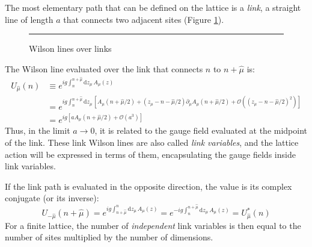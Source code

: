 The most elementary path that can be defined on the lattice is a \emph{link},
\ie a straight line of length $a$ that connects two adjacent sites (Figure \ref{fig:links}).
\begin{figure}[!htb]
    \centering
    \rule{3in}{1.5in}
    \caption{Wilson lines over links}
    \label{fig:links}
\end{figure}
The Wilson line evaluated over the link that connects $n$ to $n+\hat\mu$ is:
\begin{equation}\label{eq:link}
    \begin{aligned}
        U_{\hat\mu}(n) &\equiv e^{ig\int_n^{n+\hat\mu}\mathrm dz_\mu\,A_\mu(z)} \\
                       &= e^{ig\int_n^{n+\hat\mu}\mathrm dz_\mu\,\left[A_\mu(n+\hat\mu/2) + (z_\mu-n-\hat\mu/2)\partial_\mu A_\mu(n+\hat\mu/2)%
                                                                                     + \mathcal O\left((z_\mu-n-\hat\mu/2)^2\right)\right]} \\
                       &= e^{ig\left[aA_\mu(n+\hat\mu/2) + \mathcal O\left(a^3\right)\right]}
    \end{aligned}
\end{equation}
Thus, in the limit $a \to 0$, it is related to the gauge field evaluated at the midpoint of the link.
These link Wilson lines are also called \emph{link variables}, and the lattice action will be expressed in terms of them,
encapsulating the gauge fields inside link variables.

If the link path is evaluated in the opposite direction, the value is its complex conjugate (or its inverse):
\[
    U_{-\hat\mu}(n+\hat\mu) = e^{ig\int^n_{n+\hat\mu}\mathrm dz_\mu\,A_\mu(z)} = e^{-ig\int_n^{n+\hat\mu}\mathrm dz_\mu\,A_\mu(z)} = U^*_{\hat\mu}(n)
\]
For a finite lattice, the number of \emph{independent} link variables is then equal to the number of sites multiplied by the number of dimensions.

